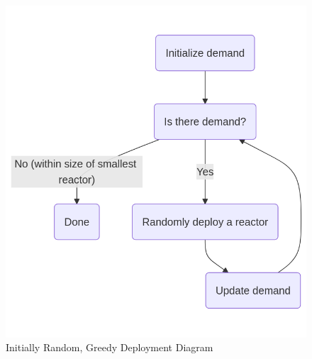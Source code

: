 \begin{figure}[!htbp]
    \centering
    \includegraphics[scale=0.4]{images/schemes/random_diagram.png}
    \caption{Initially Random, Greedy Deployment Diagram}
    \label{fig:init_random_greedy_diagram}
\end{figure}



